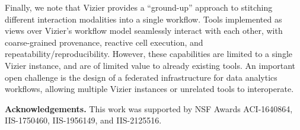 \documentclass[11pt]{article}
\numberwithin{theo}{section}
\numberwithin{exam}{section}
\numberwithin{defi}{section}
\newcommand{\mypara}[1]{\medskip\noindent\textbf{{#1}.}}
\begin{document}
Finally, we note that Vizier provides a ``ground-up'' approach to stitching different interaction modalities into a single workflow.
Tools implemented as views over Vizier's workflow model seamlessly interact with each other, with coarse-grained provenance, reactive cell execution, and repeatability/reproducibility.
However, these capabilities are limited to a single Vizier instance, and are of limited value to already existing tools.
An important open challenge is the design of a federated infrastructure for data analytics workflows, allowing multiple Vizier instances or unrelated tools to interoperate.


\mypara{Acknowledgements} This work was supported by NSF Awards ACI-1640864, IIS-1750460, IIS-1956149, and IIS-2125516. %

%
%


\end{document}
